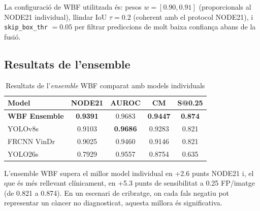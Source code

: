 \documentclass[conference]{IEEEtran}
\begin{document}
La configuració de WBF utilitzada és: pesos $w = [0.90, 0.91]$ (proporcionals al NODE21 individual), llindar IoU $\tau = 0.2$ (coherent amb el protocol NODE21), i \texttt{skip\_box\_thr} $= 0.05$ per filtrar prediccions de molt baixa confiança abans de la fusió.

\subsection{Resultats de l'ensemble}

\begin{table}[t]
\centering
\caption{Resultats de l’\textit{ensemble} WBF comparat amb models individuals}
\label{tab:ensemble}
\small
\setlength{\tabcolsep}{4pt}
\begin{tabular}{lcccc}
\toprule
Model & NODE21 & AUROC & CM & S@0.25 \\
\midrule
\textbf{WBF Ensemble} & \textbf{0.9391} & 0.9683 & \textbf{0.9447} & \textbf{0.874} \\
YOLOv8s & 0.9103 & \textbf{0.9686} & 0.9283 & 0.821 \\
FRCNN VinDr & 0.9025 & 0.9460 & 0.9146 & 0.821 \\
YOLO26s & 0.7929 & 0.9557 & 0.8754 & 0.635 \\
\bottomrule
\end{tabular}
\end{table}
\begin{table}[t]
\centering
\caption{Sensibilitat detallada per nivell de falsos positius per imatge}
\label{tab:sensitivity}
\end{table}

L'ensemble WBF supera el millor model individual en +2.6 punts NODE21 i, el que és més rellevant clínicament, en +5.3 punts de sensibilitat a 0.25 FP/imatge (de 0.821 a 0.874). En un escenari de cribratge, on cada fals negatiu pot representar un càncer no diagnosticat, aquesta millora és significativa.
\end{document}
